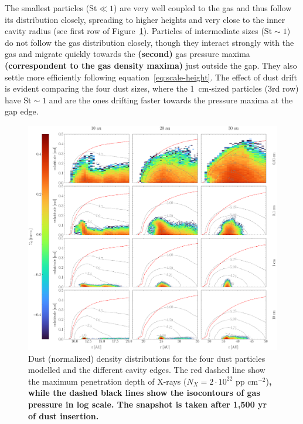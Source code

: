 \documentclass[fleqn,usenatbib]{mnras}
\begin{document}
        The smallest particles (St$\ll 1$) are very well coupled to the gas and thus follow its distribution closely, spreading to higher heights and very close to the inner cavity radius (see first row of Figure~\ref{fig:GasDustDist}).
        Particles of intermediate sizes ($\mathrm{St} \sim 1$) do not follow the gas distribution closely, though they interact strongly with the gas and migrate quickly towards the \textbf{(second)} gas pressure maxima \textbf{(correspondent to the gas density maxima)} just outside the gap.
        They also settle more efficiently following equation~\ref{eq:scale-height}.
        The effect of dust drift is evident comparing the four dust sizes, where the \SI{1}{cm}-sized particles (3rd row) have $\mathrm{St} \sim 1$ and are the ones drifting faster towards the pressure maxima at the gap edge.
        \begin{figure}
            \centering
            \includegraphics[width=\textwidth]{Fig3}
            \caption{Dust (normalized) density distributions for the four dust particles modelled and the different cavity edges. The red dashed line show the maximum penetration depth of X-rays ($N_X = 2\cdot 10^{22}$ pp cm$^{-2}$)\textbf{, while the dashed black lines show the isocontours of gas pressure in log scale. The snapshot is taken after 1,500 yr of dust insertion.}}
            \label{fig:GasDustDist}
        \end{figure}
        
\end{document}

